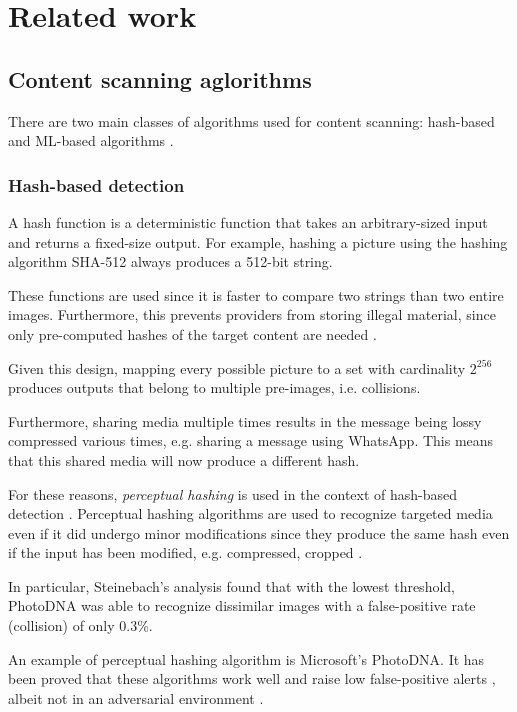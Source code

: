 \section{Related work}
\label{s:related}

\subsection{Content scanning aglorithms}
\label{ss:det_algo}

There are two main classes of algorithms used for content scanning: hash-based and ML-based algorithms \cite{abelson2024bugs}. 

\subsubsection{Hash-based detection}

A hash function is a deterministic function that takes an arbitrary-sized input and returns a fixed-size output. For example, hashing a picture using the hashing algorithm SHA-512 always produces a 512-bit string. 

These functions are used since it is faster to compare two strings than two entire images. Furthermore, this prevents providers from storing illegal material, since only pre-computed hashes of the target content are needed \cite{abelson2024bugs}. 

Given this design, mapping every possible picture to a set with cardinality $2^{256}$ produces outputs that belong to multiple pre-images, i.e. collisions. 

Furthermore, sharing media multiple times results in the message being lossy compressed various times, e.g. sharing a message using WhatsApp. This means that this shared media will now produce a different hash. 

For these reasons, \textit{perceptual hashing} is used in the context of hash-based detection \cite{abelson2024bugs}. Perceptual hashing algorithms are used to recognize targeted media even if it did undergo minor modifications since they produce the same hash even if the input has been modified, e.g. compressed, cropped \cite{abelson2024bugs}.

In particular, Steinebach's analysis found that with the lowest threshold, PhotoDNA was able to recognize dissimilar images with a false-positive rate (collision) of only 0.3\%.

An example of perceptual hashing algorithm is Microsoft's PhotoDNA. It has been proved that these algorithms work well and raise low false-positive alerts \cite{steinebach2023analysis}, albeit not in an adversarial environment \cite{prokos2021squint}.

